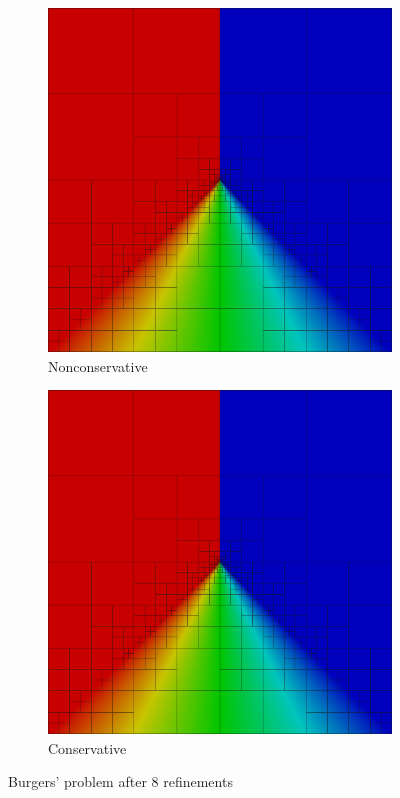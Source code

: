 \documentclass[Proposal.tex]{subfiles}
\begin{document}
\begin{figure}[p]
\centering
\begin{subfigure}[t]{0.45\textwidth}
\centering
\includegraphics[width=\textwidth]{figs/Burgers/graph8nc.png}
\caption{Nonconservative}
\label{fig:burgers8nc}
\end{subfigure}
\begin{subfigure}[t]{0.45\textwidth}
\centering
\includegraphics[width=\textwidth]{figs/Burgers/graph8c.png}
\caption{Conservative}
\label{fig:burgers8c}
\end{subfigure}
\caption{Burgers' problem after 8 refinements}
\label{fig:burgers}
\end{figure}
\end{document}
